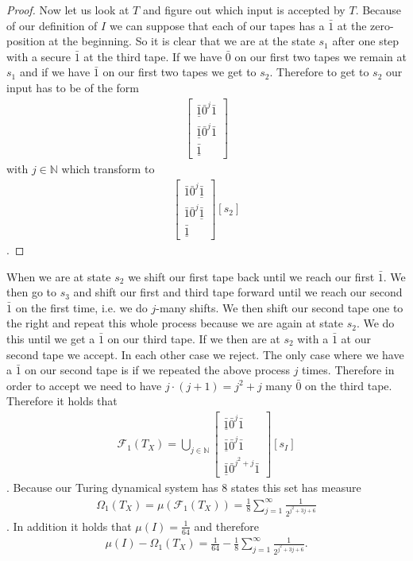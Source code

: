 \documentclass[12pt,a4paper]{scrartcl}
\numberwithin{equation}{section}
\newcommand{\N}{\mathbb{N}} %
\newcommand{\2}{\mathbb{Z} / 2 \mathbb{Z}}
\newcommand{\1}{\bar{1}}
\newcommand{\0}{\bar{0}}
\begin{document}
\begin{proof}
	Now let us look at $T$ and figure out which input is accepted by $T$. Because of our definition of $I$ we can suppose that each of our tapes has a $\1$ at the zero-position at the beginning. So it is clear that we are at the state $s_1$ after one step with a secure $\1$ at the third tape. If we have $\0$ on our first two tapes we remain at $s_1$ and if we have $\1$ on our first two tapes we get to $s_2$. Therefore to get to $s_2$ our input has to be of the form 
	\begin{align*}
		\begin{bmatrix}
			\underline{\1} \0^j \1 \\
			\underline{\1} \0^j \1 \\
			\underline{\1} 
		\end{bmatrix}
	\end{align*}
	with $j \in \N$ which transform to
	\begin{align*}
	\begin{bmatrix}
	\1 \0^j \underline{\1}  \\
	\1 \0^j \underline{\1}  \\
	\underline{\1} 
	\end{bmatrix}[s_2]
	\end{align*}.
\end{proof}
When we are at state $s_2$ we shift our first tape back until we reach our first $\1$. We then go to $s_3$ and shift our first and third tape forward until we reach our second $\1$ on the first time, i.e. we do $j$-many shifts. We then shift our second tape one to the right and repeat this whole process because we are again at state $s_2$. We do this until we get a $\1$ on our third tape. If we then are at $s_2$ with a $\1$ at our second tape we accept. In each other case we reject. The only case where we have a $\1$ on our second tape is if we repeated the above process $j$ times. Therefore in order to accept we need to have $j \cdot (j + 1) = j^2 + j$  many $\0$ on the third tape. Therefore it holds that
\begin{align*}
	\mathcal{F}_1(T_X) = \bigcup_{j \in \N}\begin{bmatrix}
	 	\underline{\1} \0^j \1 \\
	 	\underline{\1} \0^j \1 \\
	 	\underline{\1} \0^{j^2 + j} \1
	\end{bmatrix}[s_I]
\end{align*}. 
Because our Turing dynamical system  has $8$ states this set has measure 
\begin{align*}
	\Omega_1(T_X) = \mu(\mathcal{F}_1(T_X)) = \frac{1}{8} \sum_{j = 1}^{\infty} \frac{1}{2^{j^2 + 3j + 6}}
\end{align*}.
In addition it holds that $\mu (I) = \frac{1}{64}$ and therefore 
\begin{align*}
	\mu (I) - \Omega_1(T_X) = \frac{1}{64} - \frac{1}{8} \sum_{j = 1}^{\infty} \frac{1}{2^{j^2 + 3j + 6}}.
\end{align*}
\end{document}
